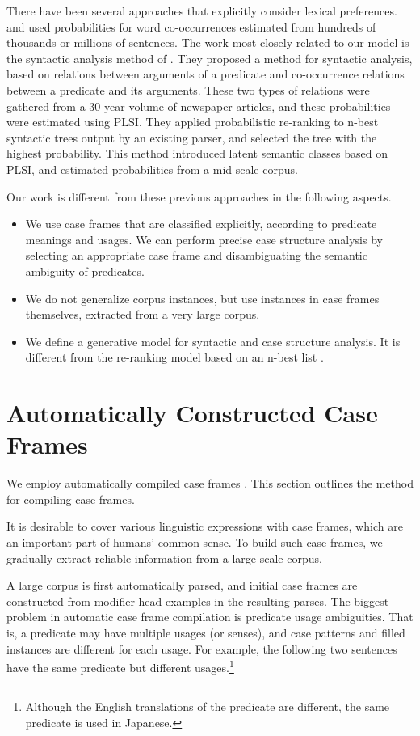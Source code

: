 \documentclass[english]{jnlp_1.4_rep}
\begin{document}
There have been several approaches that explicitly consider lexical
preferences.  and  used probabilities for word
co-occurrences estimated from hundreds of thousands or millions of
sentences. The work most closely related to
our model is the syntactic analysis method of \cite{Abekawa2006}. They
proposed a method for syntactic analysis, based on relations between
arguments of a predicate and co-occurrence relations between a
predicate and its arguments. These two types of relations were gathered
from a 30-year volume of newspaper articles, and these probabilities were
estimated using PLSI. They applied probabilistic re-ranking to n-best
syntactic trees output by an existing parser, and selected the tree with
the highest probability. This method introduced latent semantic classes
based on PLSI, and estimated probabilities from a mid-scale corpus.

Our work is different from these previous approaches in the following
aspects.
\begin{itemize}
 \item We use case frames that are classified explicitly, according to
       predicate meanings and usages. We can perform precise case
       structure analysis by selecting an appropriate case frame and
       disambiguating the semantic ambiguity of predicates.
 \item We do not generalize corpus instances, but use instances
       in case frames themselves, extracted from a very large corpus.
 \item We define a generative model for syntactic and case structure
       analysis. It is different from the re-ranking model
       based on an n-best list \cite{Abekawa2006}.
\end{itemize}


\section{Automatically Constructed Case Frames}
\label{Section::AutomaticCaseFrameConstruction}

We employ automatically compiled case frames \cite{Kawahara2006}. This
section outlines the method for compiling case frames.

It is desirable to cover various linguistic expressions with case
frames, which are an important part of humans' common sense. To build
such case frames, we gradually extract reliable information from a
large-scale corpus.

A large corpus is first automatically parsed, and initial case frames
are constructed from modifier-head examples in the resulting parses. The
biggest problem in automatic case frame compilation is predicate usage
ambiguities. That is, a predicate may have multiple usages
(or senses), and case patterns and filled instances are different for
each usage. For example, the following two sentences have the same
predicate but different usages.\footnote{Although the English
translations of the predicate are different, the same predicate is used
in Japanese.}
\end{document}
